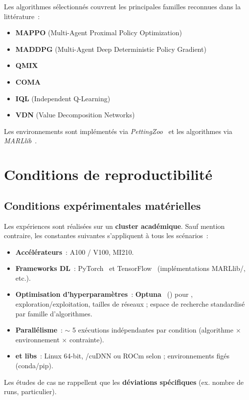 \medskip

Les algorithmes  sélectionnés couvrent les principales familles reconnues dans la littérature~:
\begin{itemize}
  \item \textbf{MAPPO} (Multi-Agent Proximal Policy Optimization)~\cite{Yu2022}
  \item \textbf{MADDPG} (Multi-Agent Deep Deterministic Policy Gradient)~\cite{lowe2017multi}
  \item \textbf{QMIX}~\cite{rashid2018qmix}
  \item \textbf{COMA}~\cite{foerster2018counterfactual}
  \item \textbf{IQL} (Independent Q-Learning)~\cite{Jiang2022}
  \item \textbf{VDN} (Value Decomposition Networks)~\cite{sunehag2018value}
\end{itemize}
Les environnements sont implémentés via \textit{PettingZoo}~\cite{terry2020pettingzoo} et les algorithmes via \textit{MARLlib}~\cite{hu2022marllib}.

\section{Conditions de reproductibilité}

\subsection{Conditions expérimentales matérielles}
\label{par:compute_conditions}
Les expériences sont réalisées sur un \textbf{cluster  académique}. Sauf mention contraire, les constantes suivantes s’appliquent à tous les scénarios~:
\begin{itemize}
  \item \textbf{Accélérateurs}~:  A100 / V100,  MI210.
  \item \textbf{Frameworks DL}~: PyTorch~\cite{Paszke2019} et TensorFlow~\cite{Abadi2016} (implémentations MARLlib/, etc.).
  \item \textbf{Optimisation d’hyperparamètres}~: \textbf{Optuna}~\cite{akiba2019optuna} () pour , exploration/exploitation, tailles de réseaux ; espace de recherche standardisé par famille d’algorithmes.
  \item \textbf{Parallélisme}~: $\sim$ 5 exécutions indépendantes par condition (algorithme $\times$ environnement $\times$ contrainte).
  \item \textbf{ et libs}~: Linux 64-bit, /cuDNN ou ROCm selon  ; environnements figés (conda/pip).
\end{itemize}
Les études de cas ne rappellent que les \textbf{déviations spécifiques} (ex. nombre de runs,  particulier).

